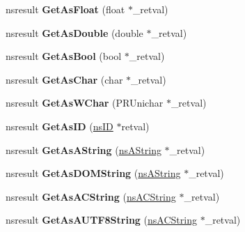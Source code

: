 \begin{DoxyCompactItemize}
\mbox{\label{interfacens_i_variant_aa23aac6a56a76b7c69f30d8fbff7bf58}} 
nsresult {\bfseries Get\+As\+Float} (float $\ast$\+\_\+retval)
\item 
\mbox{\label{interfacens_i_variant_a830e695dbb0bcab3c422a3d9803f9010}} 
nsresult {\bfseries Get\+As\+Double} (double $\ast$\+\_\+retval)
\item 
\mbox{\label{interfacens_i_variant_afdc8beb1638fdbffe128021cea3a3c4e}} 
nsresult {\bfseries Get\+As\+Bool} (bool $\ast$\+\_\+retval)
\item 
\mbox{\label{interfacens_i_variant_a6b765551c37b1e06773ac21df1183867}} 
nsresult {\bfseries Get\+As\+Char} (char $\ast$\+\_\+retval)
\item 
\mbox{\label{interfacens_i_variant_ab1ac29a81be1a60bab2b8a8153af07bb}} 
nsresult {\bfseries Get\+As\+W\+Char} (P\+R\+Unichar $\ast$\+\_\+retval)
\item 
\mbox{\label{interfacens_i_variant_a1160ec87f52f6516d43399d2e98d5263}} 
nsresult {\bfseries Get\+As\+ID} (\hyperlink{struct___i_i_d}{ns\+ID} $\ast$retval)
\item 
\mbox{\label{interfacens_i_variant_acb4cb20ba7910a11ae516a4902cd5c61}} 
nsresult {\bfseries Get\+As\+A\+String} (\hyperlink{structns_string_container}{ns\+A\+String} $\ast$\+\_\+retval)
\item 
\mbox{\label{interfacens_i_variant_a1eeccd425680fc6b2909eedabc7d773f}} 
nsresult {\bfseries Get\+As\+D\+O\+M\+String} (\hyperlink{structns_string_container}{ns\+A\+String} $\ast$\+\_\+retval)
\item 
\mbox{\label{interfacens_i_variant_a3b486e6b943c551aa7d5281575891fa1}} 
nsresult {\bfseries Get\+As\+A\+C\+String} (\hyperlink{structns_c_string_container}{ns\+A\+C\+String} $\ast$\+\_\+retval)
\item 
\mbox{\label{interfacens_i_variant_af1da6e18c51b403daab8e1fed6b1351f}} 
nsresult {\bfseries Get\+As\+A\+U\+T\+F8\+String} (\hyperlink{structns_c_string_container}{ns\+A\+C\+String} $\ast$\+\_\+retval)

\end{DoxyCompactItemize}
